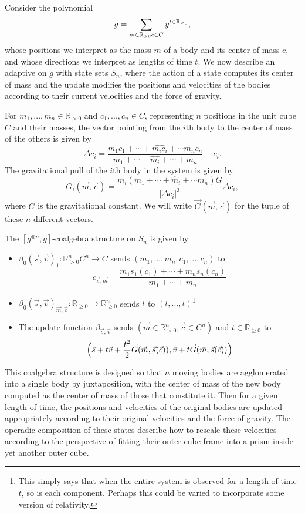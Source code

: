\documentclass[11pt, one side, article]{memoir}
\theoremstyle{definition}
\theoremstyle{plain}
\newenvironment{definition}
  {\pushQED{\qed}\renewcommand{\qedsymbol}{$\lozenge$}\definitionx}
  {\popQED\enddefinitionx}
\newcommand{\rr}{\mathbb{R}}
\newcommand{\0}{\textsf{0}}
\newcommand{\1}{\tn{\textsf{1}}}
\newcommand{\blp}{\Big{(}}
\newcommand{\brp}{\Big{)}}
\newcommand{\rrp}{\rr_{>0}}
\newcommand{\rrnn}{\rr_{\ge 0}}
\begin{document}
Consider the polynomial 
$$g = \sum_{m \in \rrp \\ c \in C} y^{t \in \rrnn},$$
whose positions we interpret as the mass $m$ of a body and its center of mass $c$, and whose directions we interpret as lengths of time $t$. We now describe an adaptive on $g$ with state sets $S_n$, where the action of a state computes its center of mass and the update modifies the positions and velocities of the bodies according to their current velocities and the force of gravity.

\begin{definition}
For $m_1,...,m_n \in \rrp$ and $c_1,...,c_n \in C$, representing $n$ positions in the unit cube $C$ and their masses, the vector pointing from the $i$th body to the center of mass of the others is given by
$$\Delta c_i = \frac{m_1c_1 + \cdots + \hat{m_ic_i} + \cdots m_nc_n}{m_1 + \cdots + \hat{m_i} + \cdots + m_n} - c_i.$$
The gravitational pull of the $i$th body in the system is given by
$$G_i(\vec m,\vec c) = \frac{m_i(m_1 + \cdots + \hat m_i + \cdots m_n)G}{|\Delta c_i|^3}\Delta c_i,$$
where $G$ is the gravitational constant. We will write $\vec G(\vec m, \vec c)$ for the tuple of these $n$ different vectors.
\end{definition}

\begin{definition}
The $[g^{\otimes n},g]$-coalgebra structure on $S_n$ is given by 
\begin{itemize}
	\item $\beta_0(\vec s,\vec v)_1 : \rrp^n C^n \to C$ sends $(m_1,...,m_n,c_1,...,c_n)$ to 
$$c_{\vec s,\vec m} = \frac{m_1s_1(c_1) + \cdots + m_ns_n(c_n)}{m_1 + \cdots + m_n}$$
	\item $\beta_0(\vec s,\vec v)_{\vec m,\vec c} : \rrnn \to \rrnn^n$ sends $t$ to $(t,...,t)$\footnote{This simply says that when the entire system is observed for a length of time $t$, so is each component. Perhaps this could be varied to incorporate some version of relativity.} 
	\item The update function $\beta_{\vec s,\vec v}$ sends $(\vec m \in \rrp^n,\vec c \in C^n)$ and $t \in \rrnn$ to 
$$\blp \vec s + t\vec v + \frac{t^2}{2} \vec G(\vec m, \vec s(\vec c)),\vec v + t\vec G(\vec m, \vec s(\vec c)) \brp$$
\end{itemize}
\end{definition}

This coalgebra structure is designed so that $n$ moving bodies are agglomerated into a single body by juxtaposition, with the center of mass of the new body computed as the center of mass of those that constitute it. Then for a given length of time, the positions and velocities of the original bodies are updated appropriately according to their original velocities and the force of gravity. The operadic composition of these states describe how to rescale these velocities according to the perspective of fitting their outer cube frame into a prism inside yet another outer cube.
\end{document}
